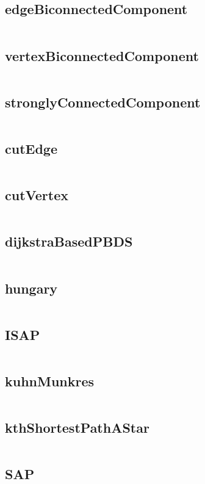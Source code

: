 \subsection{edgeBiconnectedComponent}
  \inputminted{cpp}{../code/graph/edgeBiconnectedComponent.cpp}
\subsection{vertexBiconnectedComponent}
  \inputminted{cpp}{../code/graph/vertexBiconnectedComponent.cpp}
\subsection{stronglyConnectedComponent}
  \inputminted{cpp}{../code/graph/stronglyConnectedComponent.cpp}
\subsection{cutEdge}
  \inputminted{cpp}{../code/graph/cutEdge.cpp}
\subsection{cutVertex}
  \inputminted{cpp}{../code/graph/cutVertex.cpp}
\subsection{dijkstraBasedPBDS}
  \inputminted{cpp}{../code/graph/dijkstraBasedPBDS.cpp}
\subsection{hungary}
  \inputminted{cpp}{../code/graph/hungary.cpp}
\subsection{ISAP}
  \inputminted{cpp}{../code/graph/ISAP.cpp}
\subsection{kuhnMunkres}
  \inputminted{cpp}{../code/graph/kuhnMunkres.cpp}
\subsection{kthShortestPathAStar}
  \inputminted{cpp}{../code/graph/kthShortestPathAStar.cpp}
\subsection{SAP}
  \inputminted{cpp}{../code/graph/SAP.cpp}
